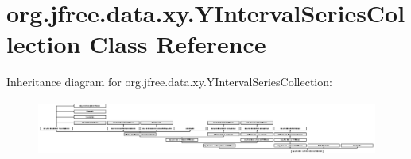 \hypertarget{classorg_1_1jfree_1_1data_1_1xy_1_1_y_interval_series_collection}{}\section{org.\+jfree.\+data.\+xy.\+Y\+Interval\+Series\+Collection Class Reference}
\label{classorg_1_1jfree_1_1data_1_1xy_1_1_y_interval_series_collection}
Inheritance diagram for org.\+jfree.\+data.\+xy.\+Y\+Interval\+Series\+Collection\+:\begin{figure}[H]
\begin{center}
\leavevmode
\includegraphics[height=1.846154cm]{classorg_1_1jfree_1_1data_1_1xy_1_1_y_interval_series_collection}
\end{center}
\end{figure}
